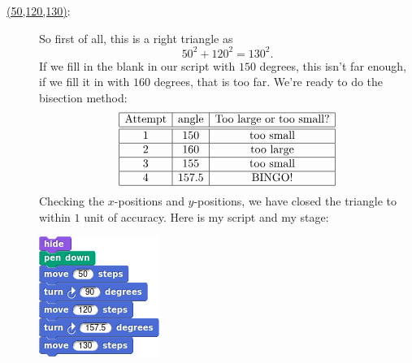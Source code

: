 \documentclass[noauthor,nooutcomes,handout]{ximera}
\begin{document}
\begin{question}
\begin{freeResponse}
\begin{description}
      \item[\underline{(50,120,130)}:] So first of all, this is a right
        triangle as
        \[
        50^2 + 120^2 =130^2.
        \]
        If we fill in the blank in our script with $150$ degrees, this
        isn't far enough, if we fill it in with $160$ degrees, that is
        too far. We're ready to do the bisection method:
        \[
        \begin{array}{|c|c|c|c|}\hline
          \text{Attempt} & \text{angle} & \text{Too large or too small?} \\ \hline\hline
          1 & 150 & \text{too small} \\ \hline
          2 & 160 & \text{too large}  \\ \hline
          3 & 155 & \text{too small}  \\ \hline
          4 & 157.5 & \text{BINGO!}  \\ \hline
        \end{array}
        \]
        Checking the $x$-positions and $y$-positions, we have closed
        the triangle to within $1$ unit of accuracy. Here is my script and my stage:
        \begin{center}
          \includegraphics[width=.3\textwidth]{50120130-script.png}   \qquad {}
        \end{center}




      




\end{description}
\end{freeResponse}
\end{question}
\end{document}
